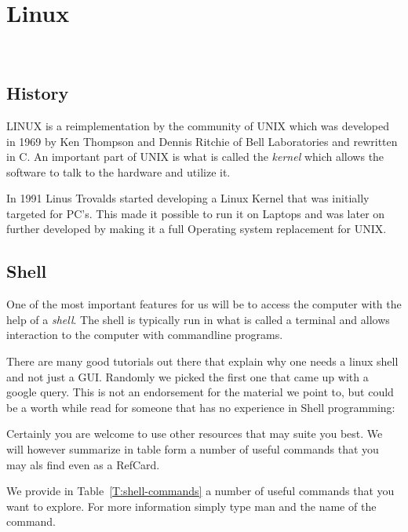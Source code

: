 
\chapter{Linux}
\label{C:linux}

\FILENAME\

\section{History}

LINUX is a reimplementation by the community of UNIX which was
developed in 1969 by Ken Thompson and Dennis Ritchie of Bell
Laboratories and rewritten in C. An important part of UNIX is what is
called the \textit{kernel} which allows the software to talk to
the hardware and utilize it. 

In 1991 Linus Trovalds started developing a Linux Kernel that was
initially targeted for PC's. This made it possible to run it on
Laptops and was later on further developed by making it a full
Operating system replacement for UNIX. 

\section{Shell}
\label{c:linux-commands}

One of the most important features for us will be to access the
computer with the help of a \textit{shell}. The shell is typically run in
what is called a terminal and allows interaction to the computer with
commandline programs. 

There are many good tutorials out there that explain why one needs a
linux shell and not just a GUI. Randomly we picked the first one that
came up with a google query. This is not an endorsement for the material
we point to, but could be a worth while read for someone that has no
experience in Shell programming:


Certainly you are welcome to use other resources that may suite you
best. We will however summarize in table form a number of useful
commands that you may als find even as a RefCard.


We provide in Table~\ref{T:shell-commands} a number of useful commands
that you want to explore. For more information simply type man and the
name of the command.



